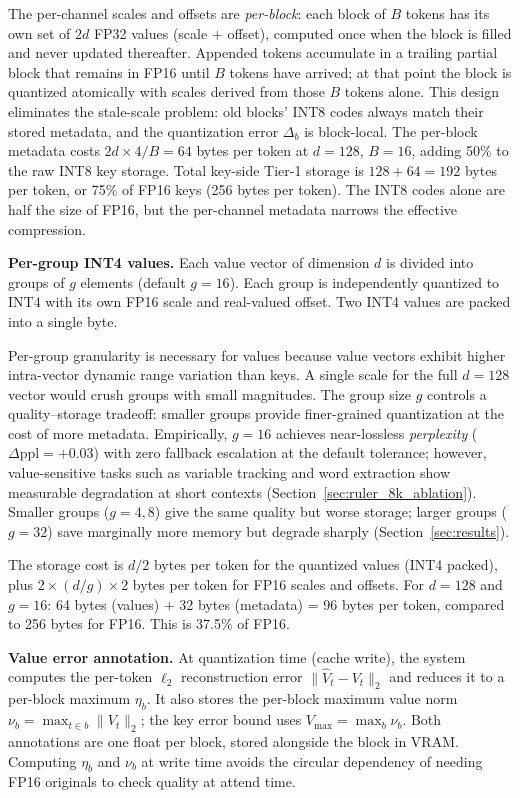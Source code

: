 \documentclass[10pt,twocolumn,a4paper]{article}
\theoremstyle{definition}
\theoremstyle{remark}
\newcommand{\norm}[1]{\lVert #1 \rVert}
\begin{document}
The per-channel scales and offsets are \emph{per-block}: each block of $B$ tokens has its own set of $2d$ FP32 values (scale + offset), computed once when the block is filled and never updated thereafter.  Appended tokens accumulate in a trailing partial block that remains in FP16 until $B$ tokens have arrived; at that point the block is quantized atomically with scales derived from those $B$ tokens alone.  This design eliminates the stale-scale problem: old blocks' INT8 codes always match their stored metadata, and the quantization error $\Delta_b$ is block-local.  The per-block metadata costs $2d \times 4 / B = 64$ bytes per token at $d{=}128$, $B{=}16$, adding 50\% to the raw INT8 key storage.  Total key-side Tier-1 storage is $128 + 64 = 192$ bytes per token, or 75\% of FP16 keys (256 bytes per token).  The INT8 codes alone are half the size of FP16, but the per-channel metadata narrows the effective compression.

\textbf{Per-group INT4 values.}  Each value vector of dimension $d$ is divided into groups of $g$ elements (default $g = 16$).  Each group is independently quantized to INT4 with its own FP16 scale and real-valued offset.  Two INT4 values are packed into a single byte.

Per-group granularity is necessary for values because value vectors exhibit higher intra-vector dynamic range variation than keys.  A single scale for the full $d{=}128$ vector would crush groups with small magnitudes.  The group size $g$ controls a quality--storage tradeoff: smaller groups provide finer-grained quantization at the cost of more metadata.  Empirically, $g{=}16$ achieves near-lossless \emph{perplexity} ($\Delta\text{ppl} = +0.03$) with zero fallback escalation at the default tolerance; however, value-sensitive tasks such as variable tracking and word extraction show measurable degradation at short contexts (Section~\ref{sec:ruler_8k_ablation}).  Smaller groups ($g{=}4, 8$) give the same quality but worse storage; larger groups ($g{=}32$) save marginally more memory but degrade sharply (Section~\ref{sec:results}).

The storage cost is $d/2$ bytes per token for the quantized values (INT4 packed), plus $2 \times (d/g) \times 2$ bytes per token for FP16 scales and offsets.  For $d{=}128$ and $g{=}16$: 64 bytes (values) + 32 bytes (metadata) = 96 bytes per token, compared to 256 bytes for FP16.  This is 37.5\% of FP16.

\textbf{Value error annotation.}  At quantization time (cache write), the system computes the per-token $\ell_2$ reconstruction error $\norm{\hat{V}_t - V_t}_2$ and reduces it to a per-block maximum $\eta_b$.  It also stores the per-block maximum value norm $\nu_b = \max_{t \in b}\norm{V_t}_2$; the key error bound uses $V_{\max} = \max_b \nu_b$.  Both annotations are one float per block, stored alongside the block in VRAM\@.  Computing $\eta_b$ and $\nu_b$ at write time avoids the circular dependency of needing FP16 originals to check quality at attend time.
\end{document}
